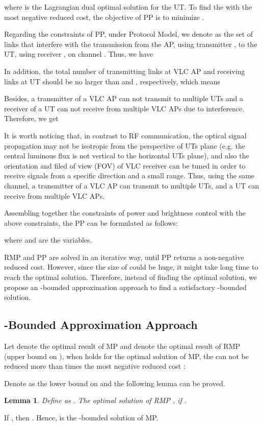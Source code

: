 \documentclass[10pt,journal]{IEEEtran}
\newtheorem{lemma}{Lemma}
\begin{document}
where  is the Lagrangian dual optimal solution for the  UT. To find the  with the most negative reduced cost, the objective of PP is to minimize .

Regarding the constraints of PP, under Protocol Model, we denote  as the set of links that interfere with the transmission from the  AP, using transmitter , to the  UT, using receiver , on channel . Thus, we have

In addition, the total number of transmitting links at VLC AP  and receiving links at UT  should be no larger than  and , respectively, which means


Besides, a transmitter of a VLC AP can not transmit to multiple UTs and a receiver of a UT can not receive from multiple VLC APs due to interference. Therefore, we get


It is worth noticing that, in contrast to RF communication, the optical signal propagation may not be isotropic from the perspective of UTs plane (e.g. the central luminous flux is not vertical to the horizontal UTs plane), and also the orientation and filed of view (FOV) of VLC receiver can be tuned in order to receive signals from a specific direction and a small range. Thus, using the same channel, a transmitter of a VLC AP can transmit to multiple UTs, and a UT can receive from multiple VLC APs.

Assembling together the constraints of power and brightness control with the above constraints, the PP can be formulated as follows:

where  and  are the variables.

RMP and PP are solved in an iterative way, until PP returns a non-negative reduced cost. However, since the size of  could be huge, it might take long time to reach the optimal solution. Therefore, instead of finding the optimal solution, we propose an -bounded approximation approach to find a satisfactory -bounded solution.

\subsection{-Bounded Approximation Approach}
Let  denote the optimal result of MP and  denote the optimal result of RMP (upper bound on ), when  holds for the optimal solution of MP, the  can not be reduced more than  times the most negative reduced cost  \cite{desrosiers2005primer} :

Denote  as the lower bound on  and the following lemma can be proved.
\begin{lemma}
Define  as . The optimal solution of RMP , if .
\end{lemma}
\begin{IEEEproof}
If , then . Hence,  is the -bounded solution of MP.
\end{IEEEproof}
\end{document}
